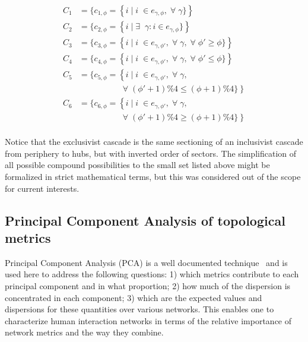 \begin{equation}
\begin{split}
C_1&=\{c_{1,\phi}=\left\{i\mid i\;\in e_{\gamma,\phi}, \;\forall\; \gamma\}\right\} \\
C_2&=\{c_{2,\phi}=\left\{i\mid \exists \;\;\gamma: i \in e_{\gamma,\phi}\}\right\} \\
C_3&=\{c_{3,\phi}=\left\{i\mid i\;\in e_{\gamma,\phi'}, \;\forall\; \gamma,\;\forall\;\phi'\geq \phi\}\right\} \\
C_4&=\{c_{4,\phi}=\left\{i\mid i\;\in e_{\gamma,\phi'}, \;\forall\; \gamma,\;\forall\;\phi'\leq \phi\}\right\} \\
C_5&=\{c_{5,\phi}=\left\{i\mid i\;\in e_{\gamma,\phi'}, \;\forall\; \gamma,\right.\\
&\;\;\;\;\;\;\;\;\;\;\;\;\;\;\;\;\;\; \left.\;\forall\;(\phi'+1)\%4\leq (\phi+1)\%4\}\right\} \\
C_6&=\{c_{6,\phi}=\left\{i\mid i\;\in e_{\gamma,\phi'}, \;\forall\; \gamma,\right.\\
&\;\;\;\;\;\;\;\;\;\;\;\;\;\;\;\;\;\; \left.\;\forall\;(\phi'+1)\%4\geq (\phi+1)\%4\}\right\} \\
\end{split}
\end{equation}

Notice that the exclusivist cascade is the same sectioning of an inclusivist cascade from periphery to hubs, but with inverted order of sectors. 
The simplification of all possible compound possibilities to the small set listed above might be formalized in strict mathematical terms, but this was considered out of the scope for current interests.




\subsection{Principal Component Analysis of topological metrics}\label{sec:pca}
Principal Component Analysis (PCA) is a well documented technique~\cite{pca} and is used here to address the following questions:	1) which metrics contribute to each principal component and in what proportion;	2) how much of the dispersion is concentrated in each component;	3) which are the expected values and dispersions for these quantities over various networks.	This enables one to characterize human interaction networks in terms of the relative importance of network metrics and the way they combine.


